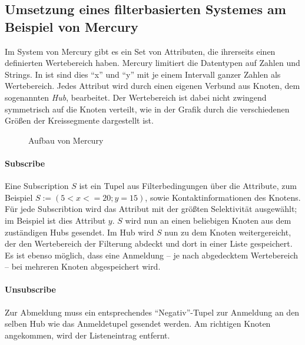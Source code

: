 \subsection[Umsetzung eines filterbasierten Systemes]{Umsetzung eines filterbasierten Systemes am Beispiel von Mercury}
\label{chap:related:mercury}
Im System von Mercury \cite{Bharambe2004Mercury} gibt es ein Set von Attributen, die ihrerseits einen definierten Wertebereich haben. Mercury limitiert die Datentypen auf Zahlen und Strings. In  ist sind dies ``x'' und ``y'' mit je einem Intervall ganzer Zahlen als Wertebereich. Jedes Attribut wird durch einen eigenen Verbund aus Knoten, dem sogenannten \emph{Hub}, bearbeitet. Der Wertebereich ist dabei nicht zwingend symmetrisch auf die Knoten verteilt, wie in der Grafik durch die verschiedenen Größen der Kreissegmente dargestellt ist. 

\begin{figure}[htbp]
\centering
{}
\caption{Aufbau von Mercury}
\label{fig:mercury}
\end{figure}

\paragraph{Subscribe}
Eine Subscription $S$ ist ein Tupel aus Filterbedingungen über die Attribute, zum Beispiel $S := (5 < x <= 20; y = 15)$, sowie Kontaktinformationen des Knotens. Für jede Subscribtion wird das Attribut mit der größten Selektivität ausgewählt; im Beispiel ist dies Attribut $y$. $S$ wird nun an einen beliebigen Knoten aus dem zuständigen Hubs gesendet. Im Hub wird $S$ nun zu dem Knoten weitergereicht, der den Wertebereich der Filterung abdeckt und dort in einer Liste gespeichert. Es ist ebenso möglich, dass eine Anmeldung -- je nach abgedecktem Wertebereich -- bei mehreren Knoten abgespeichert wird.

\paragraph{Unsubscribe}
Zur Abmeldung muss ein entsprechendes ``Negativ''-Tupel zur Anmeldung an den selben Hub wie das Anmeldetupel gesendet werden. Am richtigen Knoten angekommen, wird der Listeneintrag entfernt.

